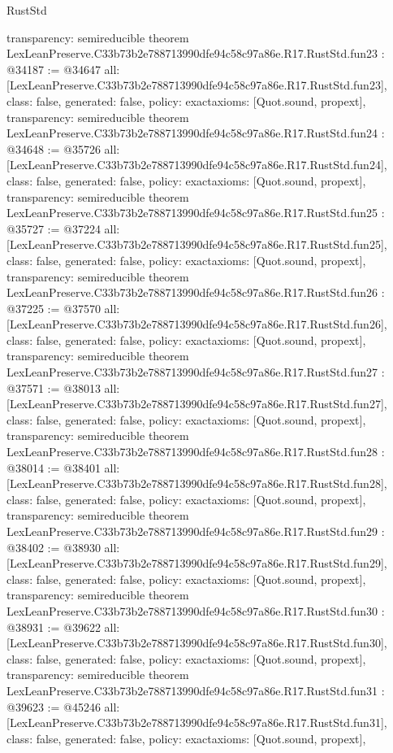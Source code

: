 \begin{lexlean}{RustStd}
\begin{coremodule}
{  transparency: semireducible
}
theorem LexLeanPreserve.C33b73b2e788713990dfe94c58c97a86e.R17.RustStd.fun23 : @34187 := @34647 {
  all: [LexLeanPreserve.C33b73b2e788713990dfe94c58c97a86e.R17.RustStd.fun23],
  class: false,
  generated: false,
  policy: exact{axioms: [Quot.sound, propext]},
  transparency: semireducible
}
theorem LexLeanPreserve.C33b73b2e788713990dfe94c58c97a86e.R17.RustStd.fun24 : @34648 := @35726 {
  all: [LexLeanPreserve.C33b73b2e788713990dfe94c58c97a86e.R17.RustStd.fun24],
  class: false,
  generated: false,
  policy: exact{axioms: [Quot.sound, propext]},
  transparency: semireducible
}
theorem LexLeanPreserve.C33b73b2e788713990dfe94c58c97a86e.R17.RustStd.fun25 : @35727 := @37224 {
  all: [LexLeanPreserve.C33b73b2e788713990dfe94c58c97a86e.R17.RustStd.fun25],
  class: false,
  generated: false,
  policy: exact{axioms: [Quot.sound, propext]},
  transparency: semireducible
}
theorem LexLeanPreserve.C33b73b2e788713990dfe94c58c97a86e.R17.RustStd.fun26 : @37225 := @37570 {
  all: [LexLeanPreserve.C33b73b2e788713990dfe94c58c97a86e.R17.RustStd.fun26],
  class: false,
  generated: false,
  policy: exact{axioms: [Quot.sound, propext]},
  transparency: semireducible
}
theorem LexLeanPreserve.C33b73b2e788713990dfe94c58c97a86e.R17.RustStd.fun27 : @37571 := @38013 {
  all: [LexLeanPreserve.C33b73b2e788713990dfe94c58c97a86e.R17.RustStd.fun27],
  class: false,
  generated: false,
  policy: exact{axioms: [Quot.sound, propext]},
  transparency: semireducible
}
theorem LexLeanPreserve.C33b73b2e788713990dfe94c58c97a86e.R17.RustStd.fun28 : @38014 := @38401 {
  all: [LexLeanPreserve.C33b73b2e788713990dfe94c58c97a86e.R17.RustStd.fun28],
  class: false,
  generated: false,
  policy: exact{axioms: [Quot.sound, propext]},
  transparency: semireducible
}
theorem LexLeanPreserve.C33b73b2e788713990dfe94c58c97a86e.R17.RustStd.fun29 : @38402 := @38930 {
  all: [LexLeanPreserve.C33b73b2e788713990dfe94c58c97a86e.R17.RustStd.fun29],
  class: false,
  generated: false,
  policy: exact{axioms: [Quot.sound, propext]},
  transparency: semireducible
}
theorem LexLeanPreserve.C33b73b2e788713990dfe94c58c97a86e.R17.RustStd.fun30 : @38931 := @39622 {
  all: [LexLeanPreserve.C33b73b2e788713990dfe94c58c97a86e.R17.RustStd.fun30],
  class: false,
  generated: false,
  policy: exact{axioms: [Quot.sound, propext]},
  transparency: semireducible
}
theorem LexLeanPreserve.C33b73b2e788713990dfe94c58c97a86e.R17.RustStd.fun31 : @39623 := @45246 {
  all: [LexLeanPreserve.C33b73b2e788713990dfe94c58c97a86e.R17.RustStd.fun31],
  class: false,
  generated: false,
  policy: exact{axioms: [Quot.sound, propext]},
}
\end{coremodule}
\end{lexlean}

